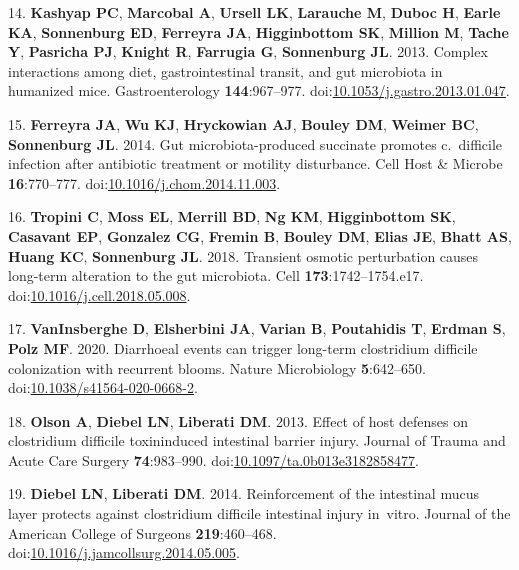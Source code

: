 \documentclass[
  11pt,
]{article}
\begin{document}
\leavevmode\hypertarget{ref-Kashyap2013}{}%
14. \textbf{Kashyap PC}, \textbf{Marcobal A}, \textbf{Ursell LK},
\textbf{Larauche M}, \textbf{Duboc H}, \textbf{Earle KA},
\textbf{Sonnenburg ED}, \textbf{Ferreyra JA}, \textbf{Higginbottom SK},
\textbf{Million M}, \textbf{Tache Y}, \textbf{Pasricha PJ},
\textbf{Knight R}, \textbf{Farrugia G}, \textbf{Sonnenburg JL}. 2013.
Complex interactions among diet, gastrointestinal transit, and gut
microbiota in humanized mice. Gastroenterology \textbf{144}:967--977.
doi:\href{https://doi.org/10.1053/j.gastro.2013.01.047}{10.1053/j.gastro.2013.01.047}.

\leavevmode\hypertarget{ref-Ferreyra2014}{}%
15. \textbf{Ferreyra JA}, \textbf{Wu KJ}, \textbf{Hryckowian AJ},
\textbf{Bouley DM}, \textbf{Weimer BC}, \textbf{Sonnenburg JL}. 2014.
Gut microbiota-produced succinate promotes c.~difficile infection after
antibiotic treatment or motility disturbance. Cell Host \& Microbe
\textbf{16}:770--777.
doi:\href{https://doi.org/10.1016/j.chom.2014.11.003}{10.1016/j.chom.2014.11.003}.

\leavevmode\hypertarget{ref-Tropini2018}{}%
16. \textbf{Tropini C}, \textbf{Moss EL}, \textbf{Merrill BD},
\textbf{Ng KM}, \textbf{Higginbottom SK}, \textbf{Casavant EP},
\textbf{Gonzalez CG}, \textbf{Fremin B}, \textbf{Bouley DM},
\textbf{Elias JE}, \textbf{Bhatt AS}, \textbf{Huang KC},
\textbf{Sonnenburg JL}. 2018. Transient osmotic perturbation causes
long-term alteration to the gut microbiota. Cell
\textbf{173}:1742--1754.e17.
doi:\href{https://doi.org/10.1016/j.cell.2018.05.008}{10.1016/j.cell.2018.05.008}.

\leavevmode\hypertarget{ref-VanInsberghe2020}{}%
17. \textbf{VanInsberghe D}, \textbf{Elsherbini JA}, \textbf{Varian B},
\textbf{Poutahidis T}, \textbf{Erdman S}, \textbf{Polz MF}. 2020.
Diarrhoeal events can trigger long-term clostridium difficile
colonization with recurrent blooms. Nature Microbiology
\textbf{5}:642--650.
doi:\href{https://doi.org/10.1038/s41564-020-0668-2}{10.1038/s41564-020-0668-2}.

\leavevmode\hypertarget{ref-Olson2013}{}%
18. \textbf{Olson A}, \textbf{Diebel LN}, \textbf{Liberati DM}. 2013.
Effect of host defenses on clostridium difficile toxininduced intestinal
barrier injury. Journal of Trauma and Acute Care Surgery
\textbf{74}:983--990.
doi:\href{https://doi.org/10.1097/ta.0b013e3182858477}{10.1097/ta.0b013e3182858477}.

\leavevmode\hypertarget{ref-Diebel2014}{}%
19. \textbf{Diebel LN}, \textbf{Liberati DM}. 2014. Reinforcement of the
intestinal mucus layer protects against clostridium difficile intestinal
injury in~vitro. Journal of the American College of Surgeons
\textbf{219}:460--468.
doi:\href{https://doi.org/10.1016/j.jamcollsurg.2014.05.005}{10.1016/j.jamcollsurg.2014.05.005}.
\end{document}
